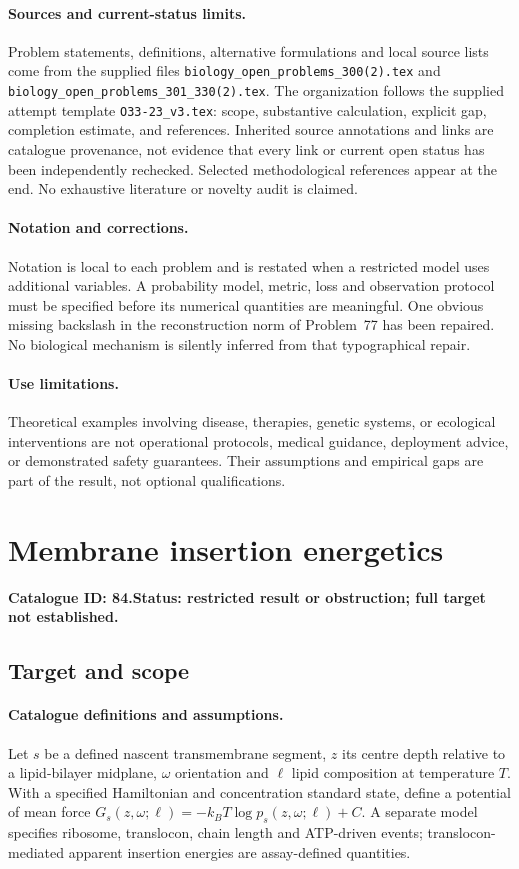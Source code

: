 \documentclass[11pt]{article}
\begin{document}
\paragraph{Sources and current-status limits.}
Problem statements, definitions, alternative formulations and local source lists
come from the supplied files
\texttt{biology\_open\_problems\_300(2).tex} and
\texttt{biology\_open\_problems\_301\_330(2).tex}.
The organization follows the supplied attempt template
\texttt{O33-23\_v3.tex}: scope, substantive calculation, explicit gap,
completion estimate, and references. Inherited source annotations and links are
catalogue provenance, not evidence that every link or current open status has
been independently rechecked. Selected methodological references appear at the
end. No exhaustive literature or novelty audit is claimed.

\paragraph{Notation and corrections.}
Notation is local to each problem and is restated when a restricted model uses
additional variables. A probability model, metric, loss and observation protocol
must be specified before its numerical quantities are meaningful. One obvious
missing backslash in the reconstruction norm of Problem~77 has been repaired.
No biological mechanism is silently inferred from that typographical repair.

\paragraph{Use limitations.}
Theoretical examples involving disease, therapies, genetic systems, or ecological
interventions are not operational protocols, medical guidance, deployment advice,
or demonstrated safety guarantees. Their assumptions and empirical gaps are part
of the result, not optional qualifications.

\setcounter{section}{83}
\section{Membrane insertion energetics}
\label{prob:084}
\noindent\textbf{Catalogue ID: 84.}\quad \textbf{Status: restricted result or obstruction; full target not established.}
\subsection{Target and scope}
\paragraph{Catalogue definitions and assumptions.}
Let $s$ be a defined nascent transmembrane segment, $z$ its centre depth relative to a lipid-bilayer midplane, $\omega$ orientation and $\ell$ lipid composition at temperature $T$. With a specified Hamiltonian and concentration standard state, define a potential of mean force $G_s(z,\omega;\ell)=-k_BT\log p_s(z,\omega;\ell)+C$. A separate model specifies ribosome, translocon, chain length and ATP-driven events; translocon-mediated apparent insertion energies are assay-defined quantities.
\end{document}
